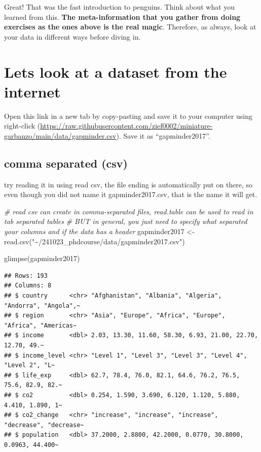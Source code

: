 \documentclass[
]{book}
\newenvironment{Shaded}{\begin{snugshade}}{\end{snugshade}}
\newcommand{\CommentTok}[1]{\textcolor[rgb]{0.56,0.35,0.01}{\textit{#1}}}
\newcommand{\FunctionTok}[1]{\textcolor[rgb]{0.00,0.00,0.00}{#1}}
\newcommand{\NormalTok}[1]{#1}
\newcommand{\OtherTok}[1]{\textcolor[rgb]{0.56,0.35,0.01}{#1}}
\newcommand{\StringTok}[1]{\textcolor[rgb]{0.31,0.60,0.02}{#1}}
\begin{document}
Great! That was the fast introduction to penguins. Think about what you
learned from this. \textbf{The meta-information that you gather from
doing exercises as the ones above is the real magic}. Therefore, as
always, look at your data in different ways before diving in.

\hypertarget{lets-look-at-a-dataset-from-the-internet}{%
\section{Lets look at a dataset from the
internet}\label{lets-look-at-a-dataset-from-the-internet}}

Open this link in a new tab by copy-pasting and save it to your computer
using right-click
(\url{https://raw.githubusercontent.com/zief0002/miniature-garbanzo/main/data/gapminder.csv}).
Save it as ``gapminder2017''.

\hypertarget{comma-separated-csv}{%
\subsection{comma separated (csv)}\label{comma-separated-csv}}

try reading it in using read csv, the file ending is automatically put
on there, so even though you did not name it gapminder2017.csv, that is
the name it will get.

\begin{Shaded}
\begin{Highlighting}[]
\CommentTok{\# read csv can create in comma{-}separated files, read.table can be used to read in tab separated tables}
\CommentTok{\# BUT in general, you just need to specify what separated your columns and if the data has a header}
\NormalTok{gapminder2017 }\OtherTok{\textless{}{-}}\FunctionTok{read.csv}\NormalTok{(}\StringTok{"\textasciitilde{}/241023\_phdcourse/data/gapminder2017.csv"}\NormalTok{)}

\FunctionTok{glimpse}\NormalTok{(gapminder2017)}
\end{Highlighting}
\end{Shaded}

\begin{verbatim}
## Rows: 193
## Columns: 8
## $ country      <chr> "Afghanistan", "Albania", "Algeria", "Andorra", "Angola",~
## $ region       <chr> "Asia", "Europe", "Africa", "Europe", "Africa", "Americas~
## $ income       <dbl> 2.03, 13.30, 11.60, 58.30, 6.93, 21.00, 22.70, 12.70, 49.~
## $ income_level <chr> "Level 1", "Level 3", "Level 3", "Level 4", "Level 2", "L~
## $ life_exp     <dbl> 62.7, 78.4, 76.0, 82.1, 64.6, 76.2, 76.5, 75.6, 82.9, 82.~
## $ co2          <dbl> 0.254, 1.590, 3.690, 6.120, 1.120, 5.880, 4.410, 1.890, 1~
## $ co2_change   <chr> "increase", "increase", "increase", "decrease", "decrease~
## $ population   <dbl> 37.2000, 2.8800, 42.2000, 0.0770, 30.8000, 0.0963, 44.400~
\end{verbatim}
\end{document}
